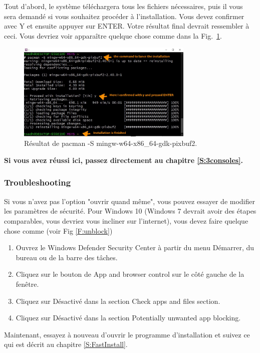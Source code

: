 \documentclass{article}
\newcommand\fig[1]{{Fig.~\ref{#1}}}
\begin{document}
Tout d'abord, le système téléchargera tous les fichiers nécessaires, puis il vous sera demandé si vous souhaitez procéder à l'installation. Vous devez confirmer avec Y et ensuite appuyer sur ENTER. Votre résultat final devrait ressembler à ceci.
Vous devriez voir apparaître quelque chose comme dans la \fig{F:pixbuf}.
\begin{figure}[H]
\center
\includegraphics[width=0.75\textwidth]{Plots/Pixbuf.jpeg}
\caption{Résultat de pacman -S mingw-w64-x86\_64-gdk-pixbuf2.\label{F:pixbuf}}
\end{figure}
\textbf{\color{Bittersweet}Si vous avez réussi ici, passez directement au chapitre \ref{S:3consoles}.}
\subsubsection{Troubleshooting\label{TroubleDeblockInstaller}}
Si vous n'avez pas l'option "ouvrir quand même", vous pouvez essayer de modifier les paramètres de sécurité. 
Pour Windows 10 (Windows 7 devrait avoir des étapes comparables, vous devriez vous incliner sur l'internet), vous devez faire quelque chose comme (voir Fig \ref{F:unblock})
\begin{enumerate}
\item Ouvrez le Windows Defender Security Center à partir du menu Démarrer, du bureau ou de la barre des tâches.
\item Cliquez sur le bouton de App and browser control sur le côté gauche de la fenêtre.
\item Cliquez sur Désactivé dans la section Check apps and files section.
\item Cliquez sur Désactivé dans la section Potentially unwanted app blocking.
\end{enumerate}
Maintenant, essayez à nouveau d'ouvrir le programme d'installation et suivez ce qui est décrit au chapitre \ref{S:FastInstall}. 
\end{document}
